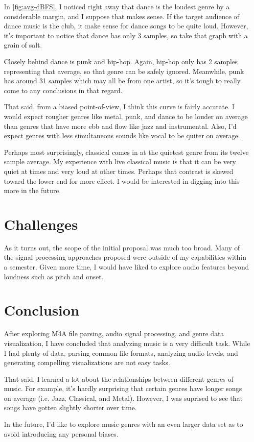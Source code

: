 \documentclass[journal]{vgtc}                %
\begin{document}
In \autoref{fig:avg-dBFS}, I noticed right away that dance is the loudest genre
by a considerable margin, and I suppose that makes sense. If the target audience
of dance music is the club, it make sense for dance songs to be quite loud.
However, it's important to notice that dance has only 3 samples, so take that
graph with a grain of salt.

Closely behind dance is punk and hip-hop. Again, hip-hop only has 2 samples
representing that average, so that genre can be safely ignored. Meanwhile,
punk has around 31 samples which may all be from one artist, so it's tough
to really come to any conclusions in that regard.

That said, from a biased point-of-view, I think this curve is fairly accurate.
I would expect rougher genres like metal, punk, and dance to be louder on
average than genres that have more ebb and flow like jazz and instrumental.
Also, I'd expect genres with less simultaneous sounds like vocal to be
quiter on average.

Perhaps most surprisingly, classical comes in at the quietest genre from its
twelve sample average. My experience with live classical music is that it can
be very quiet at times and very loud at other times. Perhaps that contrast
is skewed toward the lower end for more effect. I would be interested in digging
into this more in the future.

\section{Challenges}

As it turns out, the scope of the initial proposal was much too broad. Many of
the signal processing approaches proposed were outside of my capabilities within
a semester. Given more time, I would have liked to explore audio features beyond
loudness such as pitch and onset.

\section{Conclusion}

After exploring M4A file parsing, audio signal processing, and genre data
visualization, I have concluded that analyzing music is a very difficult task.
While I had plenty of data, parsing common file formats, analyzing audio levels,
and generating compelling visualizations are not easy tasks.

That said, I learned a lot about the relationships between different genres
of music. For example, it's hardly surprising that certain genres have
longer songs on average (i.e. Jazz, Classical, and Metal). However, I was
suprised to see that songs have gotten slightly shorter over time.

In the future, I'd like to explore music genres with an even larger data set as
to avoid introducing any personal biases.

%

%
%
%


\end{document}
